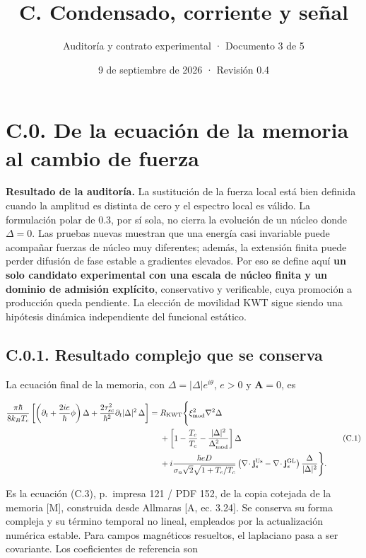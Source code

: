 \documentclass[
  spanish,
  10pt,
  a4paper,
]{article}
\title{C. Condensado, corriente y señal}
\subtitle{Auditoría y contrato experimental · Documento 3 de 5}
\author{}
\date{9 de septiembre de 2026 · Revisión 0.4}
\begin{document}
\maketitle

{
\setcounter{tocdepth}{1}
\tableofcontents
}
\newpage

\section{C.0. De la ecuación de la memoria al cambio de
fuerza}\label{c.0.-de-la-ecuaciuxf3n-de-la-memoria-al-cambio-de-fuerza}

\textbf{Resultado de la auditoría.} La sustitución de la fuerza local
está bien definida cuando la amplitud es distinta de cero y el espectro
local es válido. La formulación polar de 0.3, por sí sola, no cierra la
evolución de un núcleo donde \(\Delta=0\). Las pruebas nuevas muestran
que una energía casi invariable puede acompañar fuerzas de núcleo muy
diferentes; además, la extensión finita puede perder difusión de fase
estable a gradientes elevados. Por eso se define aquí \textbf{un solo
candidato experimental con una escala de núcleo finita y un dominio de
admisión explícito}, conservativo y verificable, cuya promoción a
producción queda pendiente. La elección de movilidad KWT sigue siendo
una hipótesis dinámica independiente del funcional estático.

\subsection{C.0.1. Resultado complejo que se
conserva}\label{c.0.1.-resultado-complejo-que-se-conserva}

La ecuación final de la memoria, con \(\Delta=|\Delta|e^{i\theta}\),
\(e>0\) y \(\mathbf A=0\), es

\[
\begin{aligned}
\frac{\pi\hbar}{8k_BT_c}\left[
\left(\partial_t+\frac{2ie}{\hbar}\phi\right)\Delta
+\frac{2\tau_{sc}^2}{\hbar^2}\partial_t|\Delta|^2\,\Delta
\right]
={}&R_{\rm KWT}\Bigg\{
\xi_{\rm mod}^2\nabla^2\Delta\\
&+\left[1-\frac{T_e}{T_c}-\frac{|\Delta|^2}{\Delta_{\rm mod}^2}\right]\Delta\\
&+i\frac{\hbar eD}{\sigma_n\sqrt2\sqrt{1+T_e/T_c}}
\left(\nabla\!\cdot\mathbf j_s^{\rm Us}-\nabla\!\cdot\mathbf j_s^{\rm GL}\right)
\frac{\Delta}{|\Delta|^2}\Bigg\}.
\end{aligned}\tag{C.1}
\]

Es la ecuación (C.3), p.~impresa 121 / PDF 152, de la copia cotejada de
la memoria {[}M{]}, construida desde Allmaras {[}A, ec. 3.24{]}. Se
conserva su forma compleja y su término temporal no lineal, empleados
por la actualización numérica estable. Para campos magnéticos resueltos,
el laplaciano pasa a ser covariante. Los coeficientes de referencia son
\end{document}
